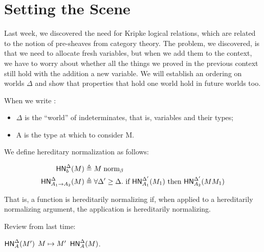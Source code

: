 \documentclass{article}
\begin{document}
\maketitle

\section{Setting the Scene}
Last week, we discovered the need for Kripke logical relations, which are related to the notion of pre-sheaves from category theory. The problem, we discovered, is that we need to allocate fresh variables, but when we add them to the context, we have to worry about whether all the things we proved in the previous context still hold with the addition a new variable. We will establish an ordering on worlds $\Delta$ and show that properties that hold one world hold in future worlds too.

When we write :
\begin{itemize}
\item $\Delta$ is the ``world'' of indeterminates, that is, variables and their types;
\item A is the type at which to consider M.
\end{itemize}


We define hereditary normalization as follows:

\begin{align*}
\hnorm{\Delta}{b}{M} &\triangleq \bnorm{M} \\
\hnorm{\Delta}{\fn{A_1}{A_2}}{M} &\triangleq  \forall \Delta' \geq \Delta. \  \text{if} \ \hnorm{\Delta'}{A_1}{M_1}\  \text{then} \ \hnorm{\Delta'}{A_2}{M M_1}
\end{align*}


That is, a function is hereditarily normalizing if, when applied to a hereditarily normalizing argument, the application is hereditarily normalizing.

Review from last time:
\begin{lemma}\label{lem:hexp}
   $\mathsf{HN}^{\Delta}_{A}(M')$  $M \mapsto M'$  $\mathsf{HN}^{\Delta}_{A}(M)$.
\end{lemma}
\end{document}
